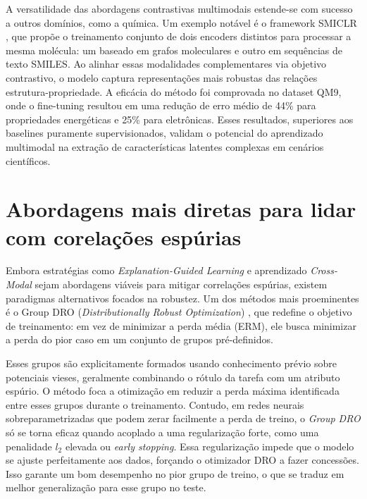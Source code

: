 A versatilidade das abordagens contrastivas multimodais estende-se com sucesso a outros domínios, como a química. Um exemplo notável é o framework SMICLR \cite{smiclr}, que propõe o treinamento conjunto de dois encoders distintos para processar a mesma molécula: um baseado em grafos moleculares e outro em sequências de texto SMILES. Ao alinhar essas modalidades complementares via objetivo contrastivo, o modelo captura representações mais robustas das relações estrutura-propriedade. A eficácia do método foi comprovada no dataset QM9, onde o fine-tuning resultou em uma redução de erro médio de 44\% para propriedades energéticas e 25\% para eletrônicas. Esses resultados, superiores aos baselines puramente supervisionados, validam o potencial do aprendizado multimodal na extração de características latentes complexas em cenários científicos.

\section{Abordagens mais diretas para lidar com corelações espúrias}

Embora estratégias como \textit{Explanation-Guided Learning} e aprendizado \textit{Cross-Modal} sejam abordagens viáveis para mitigar correlações espúrias, existem paradigmas alternativos focados na robustez. Um dos métodos mais proeminentes é o Group DRO (\textit{Distributionally Robust Optimization}) \cite{group_dro}, que redefine o objetivo de treinamento: em vez de minimizar a perda média (ERM), ele busca minimizar a perda do pior caso em um conjunto de grupos pré-definidos.

Esses grupos são explicitamente formados usando conhecimento prévio sobre potenciais vieses, geralmente combinando o rótulo da tarefa com um atributo espúrio. O método foca a otimização em reduzir a perda máxima identificada entre esses grupos durante o treinamento. Contudo, em redes neurais sobreparametrizadas que podem zerar facilmente a perda de treino, o \textit{Group DRO} só se torna eficaz quando acoplado a uma regularização forte, como uma penalidade $l_2$ elevada ou \textit{early stopping}. Essa regularização impede que o modelo se ajuste perfeitamente aos dados, forçando o otimizador DRO a fazer concessões. Isso garante um bom desempenho no pior grupo de treino, o que se traduz em melhor generalização para esse grupo no teste.

